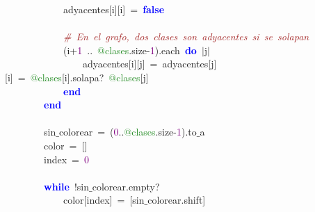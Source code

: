 \mbox{}\ \ \ \ \ \ \ \ \ \ \ \ adyacentes\textcolor{BrickRed}{[}i\textcolor{BrickRed}{][}i\textcolor{BrickRed}{]}\ \textcolor{BrickRed}{=}\ \textbf{\textcolor{Blue}{false}} \\
\mbox{} \\
\mbox{}\ \ \ \ \ \ \ \ \ \ \ \ \textit{\textcolor{Brown}{\#\ En\ el\ grafo,\ dos\ clases\ son\ adyacentes\ si\ se\ solapan}} \\
\mbox{}\ \ \ \ \ \ \ \ \ \ \ \ \textcolor{BrickRed}{(}i\textcolor{BrickRed}{+}\textcolor{Purple}{1}\ \textcolor{BrickRed}{..}\ \textcolor{ForestGreen}{@clases}\textcolor{BrickRed}{.}size\textcolor{BrickRed}{-}\textcolor{Purple}{1}\textcolor{BrickRed}{).}each\ \textbf{\textcolor{Blue}{do}}\ \textcolor{BrickRed}{$|$}j\textcolor{BrickRed}{$|$} \\
\mbox{}\ \ \ \ \ \ \ \ \ \ \ \ \ \ \ \ adyacentes\textcolor{BrickRed}{[}i\textcolor{BrickRed}{][}j\textcolor{BrickRed}{]}\ \textcolor{BrickRed}{=}\ adyacentes\textcolor{BrickRed}{[}j\textcolor{BrickRed}{][}i\textcolor{BrickRed}{]}\ \textcolor{BrickRed}{=}\ \textcolor{ForestGreen}{@clases}\textcolor{BrickRed}{[}i\textcolor{BrickRed}{].}solapa?\ \textcolor{ForestGreen}{@clases}\textcolor{BrickRed}{[}j\textcolor{BrickRed}{]} \\
\mbox{}\ \ \ \ \ \ \ \ \ \ \ \ \textbf{\textcolor{Blue}{end}} \\
\mbox{}\ \ \ \ \ \ \ \ \textbf{\textcolor{Blue}{end}} \\
\mbox{}\ \ \ \ \ \ \ \  \\
\mbox{}\ \ \ \ \ \ \ \ sin$\_$colorear\ \textcolor{BrickRed}{=}\ \textcolor{BrickRed}{(}\textcolor{Purple}{0}\textcolor{BrickRed}{..}\textcolor{ForestGreen}{@clases}\textcolor{BrickRed}{.}size\textcolor{BrickRed}{-}\textcolor{Purple}{1}\textcolor{BrickRed}{).}to$\_$a \\
\mbox{}\ \ \ \ \ \ \ \ color\ \textcolor{BrickRed}{=}\ \textcolor{BrickRed}{[]} \\
\mbox{}\ \ \ \ \ \ \ \ index\ \textcolor{BrickRed}{=}\ \textcolor{Purple}{0} \\
\mbox{}\ \ \ \ \ \ \ \  \\
\mbox{}\ \ \ \ \ \ \ \ \textbf{\textcolor{Blue}{while}}\ \textcolor{BrickRed}{!}sin$\_$colorear\textcolor{BrickRed}{.}empty? \\
\mbox{}\ \ \ \ \ \ \ \ \ \ \ \ color\textcolor{BrickRed}{[}index\textcolor{BrickRed}{]}\ \textcolor{BrickRed}{=}\ \textcolor{BrickRed}{[}sin$\_$colorear\textcolor{BrickRed}{.}shift\textcolor{BrickRed}{]} \\
\mbox{}\ \ \ \ \ \ \ \ \ \ \ \  \\
